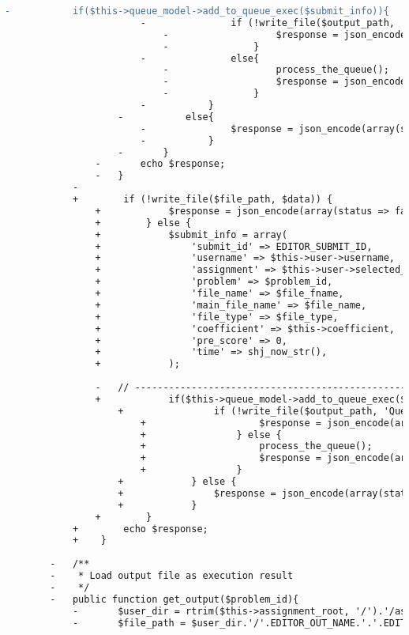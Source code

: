\begin{lstlisting}[language=diff, caption=Perubahan pada kode Submit.php]
					-			if($this->queue_model->add_to_queue_exec($submit_info)){
						-				if (!write_file($output_path, 'Queueing...')){
							-					$response = json_encode(array(status=>FALSE, message=>'Unable to write output file'));
							-				}
						-				else{
							-					process_the_queue();
							-					$response = json_encode(array(status=>TRUE, message=>'Executing'));
							-				}
						-			}
					-			else{
						-				$response = json_encode(array(status=>FALSE, message=>'Still in queue'));
						-			}
					-		}
				-		echo $response;
				-	}
			-	
			+        if (!write_file($file_path, $data)) {
				+            $response = json_encode(array(status => false, message => 'Unable to execute', debug => $file_path));
				+        } else {
				+            $submit_info = array(
				+                'submit_id' => EDITOR_SUBMIT_ID,
				+                'username' => $this->user->username,
				+                'assignment' => $this->user->selected_assignment['id'],
				+                'problem' => $problem_id,
				+                'file_name' => $file_fname,
				+                'main_file_name' => $file_name,
				+                'file_type' => $file_type,
				+                'coefficient' => $this->coefficient,
				+                'pre_score' => 0,
				+                'time' => shj_now_str(),
				+            );
				
				-	// ------------------------------------------------------------------------
				+            if($this->queue_model->add_to_queue_exec($submit_info)) {
					+                if (!write_file($output_path, 'Queueing...')) {
						+                    $response = json_encode(array(status => false, message => 'Unable to write output file'));
						+                } else {
						+                    process_the_queue();
						+                    $response = json_encode(array(status => true, message => 'Executing'));
						+                }
					+            } else {
					+                $response = json_encode(array(status => false, message => 'Still in queue'));
					+            }
				+        }
			+        echo $response;
			+    }
		
		-	/**
		-	 * Load output file as execution result
		-	 */
		-	public function get_output($problem_id){
			-		$user_dir = rtrim($this->assignment_root, '/').'/assignment_'.$this->user->selected_assignment['id'].'/p'.$problem_id.'/'.$this->user->username;
			-		$file_path = $user_dir.'/'.EDITOR_OUT_NAME.'.'.EDITOR_FILE_EXT;
			

\end{lstlisting}
